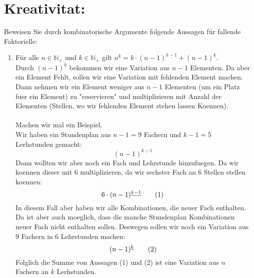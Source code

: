     \section*{Kreativitat:}
    Beweisen Sie durch kombinatorische Argumente folgende Aussagen für fallende Faktorielle:
    \begin{enumerate}[label=(\alph*)]
        \item Für alle $n \in \mathbb{N}_+$ und $k \in \mathbb{N}_+$ gilt 	
        $n^{\underline{k}} = k \cdot (n-1)^{\underline{k-1}} +(n-1)^{\underline{k}}$.\\
        Durch $(n-1)^{\underline{k}}$ bekommen wir eine Variation aus $n-1$ Elementen.
        Da aber ein Element Fehlt, sollen wir eine Variation mit fehlenden Element machen.
        Dann nehmen wir ein Element weniger aus $n-1$ Elementen (um ein Platz fuer ein Element) 
        zu "reservieren" und multiplizieren mit Anzahl der Elementen (Stellen, wo wir
        fehlenden Element stehen lassen Koennen). \\\\
        Machen wir mal ein Beispiel.\\
        Wir haben ein Stundenplan aus $n-1 = 9$ Fachern und $k-1 = 5$ Lerhstunden gemacht:
        \[(n-1)^{\underline{k-1}}\]
        Dann wollten wir aber noch ein Fach und Lehrstunde hinzufuegen. Da wir koennen
        dieser mit 6 multiplizieren, da wir sechster Fach an 6 Stellen stellen koennen: 
        \[6\cdot(n-1)^{\underline{k-1}} \textrm{\qquad (1)}\]
        In diesem Fall aber haben wir alle Kombinationen, die neuer Fach enthalten. 
        Da ist aber auch moeglich, dass die manche Stundenplan Kombinationen neuer Fach 
        nicht enthalten sollen. Deswegen sollen wir noch ein Variation aus 9 Fachern 
        in 6 Lehrstunden machen: 
        \[(n-1)^{\underline{k}} \textrm{\qquad (2)}\]
        Folglich die Summe von Aussagen (1) und (2) ist eine Variation aus $n$ Fachern 
        an $k$ Lerhstunden. 
    \end{enumerate}
